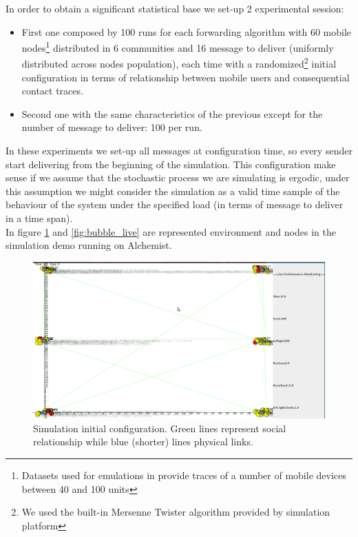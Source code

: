 In order to obtain a significant statistical base we set-up 2 experimental session:
\begin{itemize}
\item First one composed by 100 runs for each forwarding algorithm with 60 mobile nodes\footnote{Datasets used for emulations in\cite{bubble} provide traces of a number of mobile devices between 40 and 100 units} distributed in 6 communities and 16 message to deliver (uniformly distributed across nodes population), each time with a randomized\footnote{We used the built-in Mersenne Twister algorithm provided by simulation platform} initial configuration in terms of relationship between mobile users and consequential contact traces.
\item Second one with the same characteristics of the previous except for the number of message to deliver: 100 per run. 
\end{itemize}
In these experiments we set-up all messages at configuration time, so every sender start delivering from the beginning of the simulation. This configuration make sense if we assume that the stochastic process we are simulating is ergodic, under this assumption we might consider the simulation as a valid time sample of the behaviour of the system under the specified load (in terms of message to deliver in a time span).\\
In figure \ref{fig:bubble_live_init} and \ref{fig:bubble_live} are represented environment and nodes in the simulation demo running on Alchemist.
\begin{figure}[h!]
	\begin{center}
    \includegraphics[scale=0.25]{img/bubble_live_init.png}
    \caption{Simulation initial configuration. Green lines represent social relationship while blue (shorter) lines physical links.}
    \label{fig:bubble_live_init}
  \end{center}
\end{figure}
